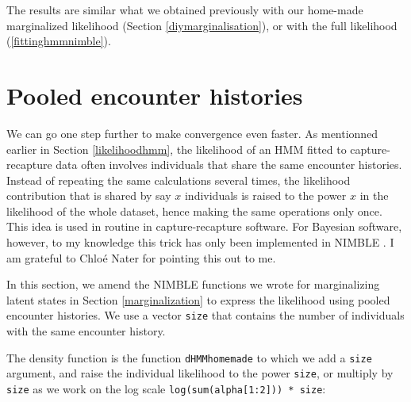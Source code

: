 \documentclass[
  12pt,
]{krantz}
\begin{document}
The results are similar what we obtained previously with our home-made marginalized likelihood (Section \ref{diymarginalisation}), or with the full likelihood (\ref{fittinghmmnimble}).

\section{Pooled encounter histories}\label{pooled-likelihood}

We can go one step further to make convergence even faster. As mentionned earlier in Section \ref{likelihoodhmm}, the likelihood of an HMM fitted to capture-recapture data often involves individuals that share the same encounter histories. Instead of repeating the same calculations several times, the likelihood contribution that is shared by say \(x\) individuals is raised to the power \(x\) in the likelihood of the whole dataset, hence making the same operations only once. This idea is used in routine in capture-recapture software. For Bayesian software, however, to my knowledge this trick has only been implemented in NIMBLE \citep{TurekEtAl2016}. I am grateful to Chloé Nater for pointing this out to me.

In this section, we amend the NIMBLE functions we wrote for marginalizing latent states in Section \ref{marginalization} to express the likelihood using pooled encounter histories. We use a vector \texttt{size} that contains the number of individuals with the same encounter history.

The density function is the function \texttt{dHMMhomemade} to which we add a \texttt{size} argument, and raise the individual likelihood to the power \texttt{size}, or multiply by \texttt{size} as we work on the log scale \texttt{log(sum(alpha{[}1:2{]}))\ *\ size}:
\end{document}
